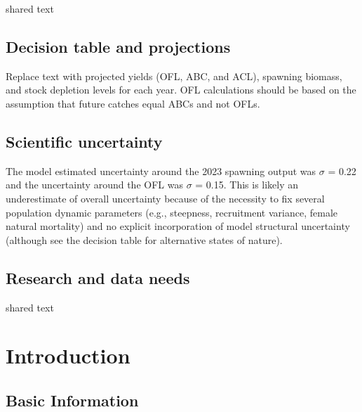 \documentclass[11pt,
  english,
  letterpaper,
]{article}
\begin{document}
shared text

\hypertarget{decision-table-and-projections}{%
\subsection*{Decision table and projections}\label{decision-table-and-projections}}

Replace text with projected yields (OFL, ABC, and ACL), spawning biomass, and stock depletion levels for each year. OFL calculations should be based on the assumption that future catches equal ABCs and not OFLs.

\hypertarget{scientific-uncertainty}{%
\subsection*{Scientific uncertainty}\label{scientific-uncertainty}}

The model estimated uncertainty around the 2023 spawning output was \(\sigma\) = 0.22 and the uncertainty around the OFL was \(\sigma\) = 0.15. This is likely an underestimate of overall uncertainty because of the necessity to fix several population dynamic parameters (e.g., steepness, recruitment variance, female natural mortality) and no explicit incorporation of model structural uncertainty (although see the decision table for alternative states of nature).

\hypertarget{research-and-data-needs}{%
\subsection*{Research and data needs}\label{research-and-data-needs}}

shared text

\pagebreak
\setlength{\parskip}{5mm plus1mm minus1mm}
\setcounter{page}{1}
\renewcommand{\thefigure}{\arabic{figure}}
\renewcommand{\thetable}{\arabic{table}}
\setcounter{table}{0}
\setcounter{figure}{0}

\hypertarget{introduction}{%
\section{Introduction}\label{introduction}}

\hypertarget{basic-information}{%
\subsection{Basic Information}\label{basic-information}}
\end{document}

